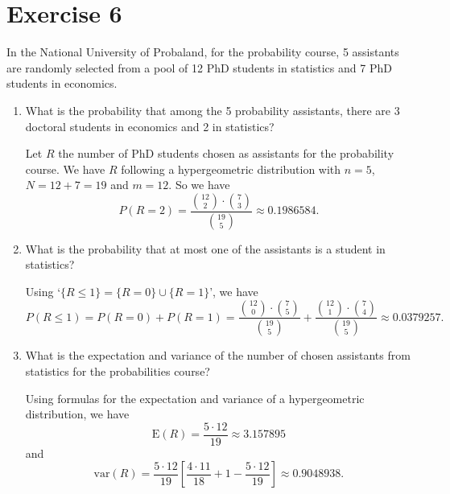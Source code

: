 \documentclass[12pt,thmsa]{article}
\begin{document}
\section*{Exercise 6}

In the National University of Probaland, for the probability course, 5 assistants are randomly selected from a pool of 12 PhD students in statistics and 7 PhD students in economics.

\begin{enumerate}
\item What is the probability that among the 5 probability assistants, there are 3 doctoral students in economics and 2 in statistics?

Let $ R $ the number of PhD students chosen as assistants for the probability course. We have $ R $ following a hypergeometric distribution with $n=5$, $N=12+7=19$ and $m=12$. So we have 
\begin{equation*}
P(R=2)=   \frac{\binom{12}{2} \cdot \binom{7}{3}}{\binom{19}{5}} \approx 0.1986584.
\end{equation*}

\item What is the probability that at most one of the assistants is a student in statistics?

Using `$\{R\leq 1\}=\{R=0\}\cup\{R= 1\}$', we have
\begin{equation*}
P(R\leq 1)= P(R=0)+P(R=1) = \frac{\binom{12}{0}  \cdot \binom{7}{5}}{\binom{19}{5}} + \frac{\binom{12}{1}  \cdot \binom{7}{4}}{\binom{19}{5}} \approx 0.0379257.
\end{equation*}
\item What is the expectation and variance of the number of chosen assistants from statistics for the probabilities course?

Using formulas for the expectation and variance of a
hypergeometric distribution, we have
$$
\text{E}(R) = \frac{5\cdot 12}{19} \approx 3.157895
$$
and
$$
\text{var}(R) =   \frac{5\cdot 12}{19}\left[\frac{4\cdot 11}{18}+1-\frac{5\cdot 12}{19}\right] \approx 0.9048938.
$$
\end{enumerate}
\end{document}
